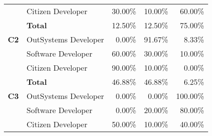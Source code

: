 \begin{table}[tb]
\begin{tabular}{@{}llrrr@{}}
                              & Citizen Developer    & 30.00\%                                                           & 10.00\%                                                                 & 60.00\%                                                       \\
                              & \textbf{Total}       & 12.50\%                                                           & 12.50\%                                                                 & 75.00\%                                                       \\ \midrule
    \textbf{C2}               & OutSystems Developer & 0.00\%                                                            & 91.67\%                                                                 & 8.33\%                                                        \\
                              & Software Developer   & 60.00\%                                                           & 30.00\%                                                                 & 10.00\%                                                       \\
                              & Citizen Developer    & 90.00\%                                                           & 10.00\%                                                                 & 0.00\%                                                        \\
                              & \textbf{Total}       & 46.88\%                                                           & 46.88\%                                                                 & 6.25\%                                                        \\ \midrule
    \textbf{C3}               & OutSystems Developer & 0.00\%                                                            & 0.00\%                                                                  & 100.00\%                                                      \\
                              & Software Developer   & 0.00\%                                                            & 20.00\%                                                                 & 80.00\%                                                       \\
                              & Citizen Developer    & 50.00\%                                                           & 10.00\%                                                                 & 40.00\%                                                       \\

\end{tabular}
\end{table}
